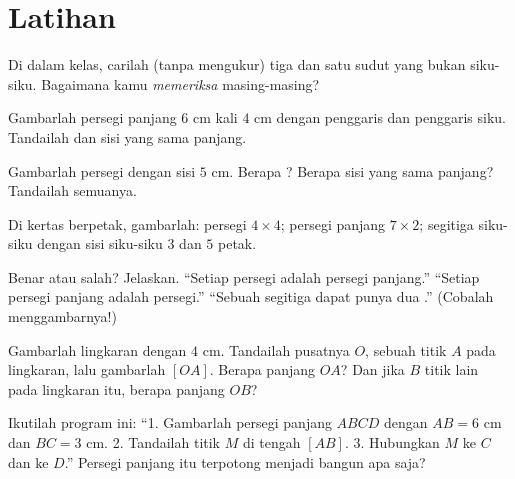 \section{Latihan}

\begin{exercise}[$\star$]\label{exo:g3:shapes:1}
Di dalam kelas, carilah (tanpa mengukur) tiga  dan
satu sudut yang bukan siku-siku. Bagaimana kamu \emph{memeriksa} masing-masing?
\end{exercise}

\begin{exercise}[$\star$]\label{exo:g3:shapes:2}
Gambarlah persegi panjang $6$ cm kali $4$ cm dengan penggaris dan
penggaris siku. Tandailah  dan sisi yang sama panjang.
\end{exercise}

\begin{exercise}[$\star$]\label{exo:g3:shapes:3}
Gambarlah persegi dengan sisi $5$ cm. Berapa ?
Berapa sisi yang sama panjang? Tandailah semuanya.
\end{exercise}

\begin{exercise}[$\star$]\label{exo:g3:shapes:4}
Di kertas berpetak, gambarlah: persegi $4 \times 4$; persegi panjang
$7 \times 2$; segitiga siku-siku dengan sisi siku-siku $3$ dan $5$ petak.
\end{exercise}

\begin{exercise}[$\star$]\label{exo:g3:shapes:5}
Benar atau salah? Jelaskan.
``Setiap persegi adalah persegi panjang.'' \quad
``Setiap persegi panjang adalah persegi.'' \quad
``Sebuah segitiga dapat punya dua .'' (Cobalah menggambarnya!)
\end{exercise}

\begin{exercise}[$\star$]\label{exo:g3:shapes:6}
Gambarlah lingkaran dengan  $4$ cm. Tandailah pusatnya $O$,
sebuah titik $A$ pada lingkaran, lalu gambarlah  $[OA]$.
Berapa panjang $OA$? Dan jika $B$ titik lain pada lingkaran itu,
berapa panjang $OB$?
\end{exercise}

\begin{exercise}[$\star$]\label{exo:g3:shapes:7}
Ikutilah program ini: ``1. Gambarlah persegi panjang $ABCD$ dengan
$AB = 6$ cm dan $BC = 3$ cm. 2. Tandailah titik $M$ di tengah
$[AB]$. 3. Hubungkan $M$ ke $C$ dan ke $D$.'' Persegi panjang itu
terpotong menjadi bangun apa saja?
\end{exercise}

